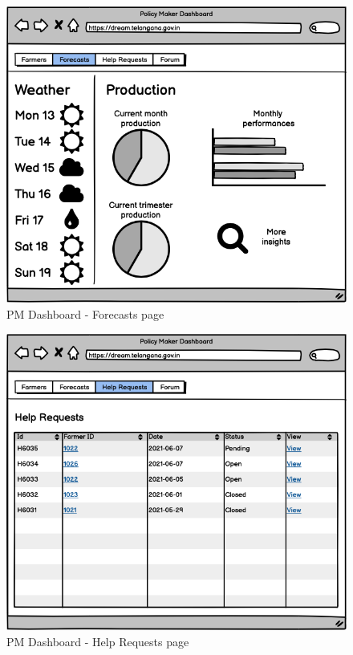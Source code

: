 \documentclass[10pt]{article}
\begin{document}
\begin{figure}[ht!]
    \centering
    \includegraphics[scale=0.40]{ui/pm_forecasts.png}
    \caption{PM Dashboard - Forecasts page}
\end{figure}
\begin{figure}[ht!]
    \centering
    \includegraphics[scale=0.40]{ui/pm_helprequests.png}
    \caption{PM Dashboard - Help Requests page}
\end{figure}
\end{document}
